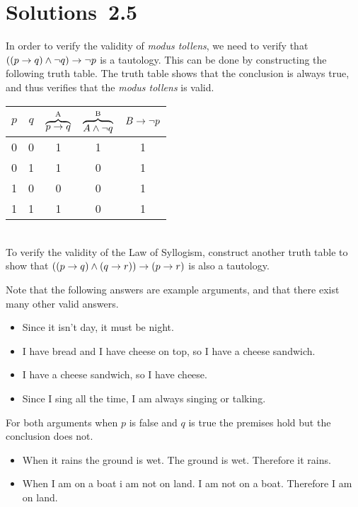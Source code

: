\section*{Solutions~2.5}%

\begin{solutions}
	\solution In order to verify the validity of \textit{modus tollens}, we need to verify that $((p \rightarrow q)\wedge \lnot q) \rightarrow \lnot p$ is a tautology. This can be done by constructing the following truth table. The truth table shows that the conclusion is always true, and thus verifies that the \textit{modus tollens} is valid.\\
	
	\begin{tabular}{cc | ccc}
		\toprule
		$p$& $q$& $\overbrace{p\rightarrow q}^\text{A}$& $\overbrace{A \wedge \lnot q}^\text{B}$& $B \rightarrow \lnot p$ \\
		\midrule
		\strut
		0& 0& 1& 1& 1\\
		0& 1& 1& 0& 1\\
		1& 0& 0& 0& 1\\
		1& 1& 1& 0& 1\\
		\bottomrule
	\end{tabular} \\
	
	To verify the validity of the Law of Syllogism, construct another truth table to show that $((p \rightarrow q) \wedge (q \rightarrow r)) \rightarrow (p \rightarrow r)$ is also a tautology. 
	
	\solution Note that the following answers are example arguments, and that there exist many other valid answers. 
	
	\begin{itemize}
		\item Since it isn't day, it must be night.
		\item I have bread and I have cheese on top, so I have a cheese sandwich. 
		\item I have a cheese sandwich, so I have cheese. 
		\item Since I sing all the time, I am always singing or talking. 
	\end{itemize}
	

  \solution
  For both arguments when $p$ is false and $q$ is true the premises hold but the
  conclusion does not.

  \begin{itemize}
    \item When it rains the ground is wet. The ground is wet. Therefore it rains.
    \item When I am on a boat i am not on land. I am not on a boat. Therefore I
      am on land.
  \end{itemize}




\end{solutions}
